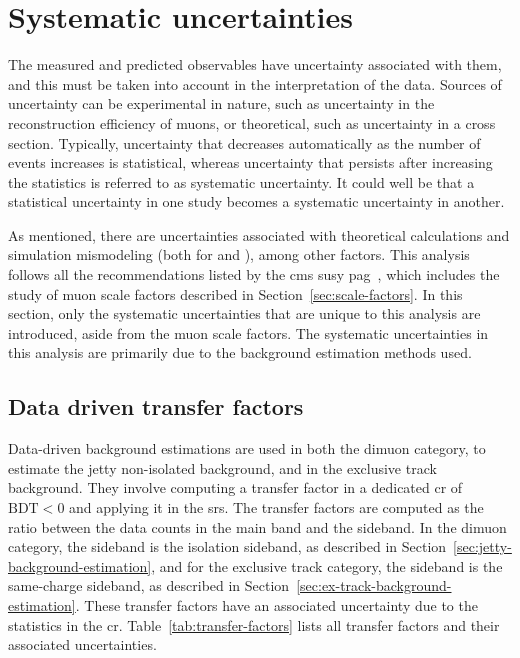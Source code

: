 \clearpage
\section{Systematic uncertainties}
\label{sec:systematic-uncertainties}

The measured and predicted observables have uncertainty associated with them, and this must be taken into account in the interpretation of the data. Sources of uncertainty can be experimental in nature, such as uncertainty in the reconstruction efficiency of muons, or theoretical, such as uncertainty in a cross section. Typically, uncertainty that decreases automatically as the number of events increases is statistical, whereas uncertainty that persists after increasing the statistics is referred to as systematic uncertainty. It could well be that a statistical uncertainty in one study becomes a systematic uncertainty in another.

As mentioned, there are uncertainties associated with theoretical calculations and simulation mismodeling (both for \FASTSIM and \FULLSIM), among other factors. This analysis follows all the recommendations listed by the \gls{cms} \gls{susy} \gls{pag}~\cite{sus-pag-recommendations}, which includes the study of muon scale factors described in Section~\ref{sec:scale-factors}. In this section, only the systematic uncertainties that are unique to this analysis are introduced, aside from the muon scale factors. The systematic uncertainties in this analysis are primarily due to the background estimation methods used.

\subsection{Data driven transfer factors}
\label{sec:data-driven-tranfer-factors}

Data-driven background estimations are used in both the dimuon category, to estimate the jetty non-isolated background, and in the exclusive track background. They involve computing a transfer factor in a dedicated \gls{cr} of $\text{BDT}<0$ and applying it in the \glspl{sr}. The transfer factors are computed as the ratio between the data counts in the main band and the sideband. In the dimuon category, the sideband is the isolation sideband, as described in Section~\ref{sec:jetty-background-estimation}, and for the exclusive track category, the sideband is the same-charge sideband, as described in Section~\ref{sec:ex-track-background-estimation}. These transfer factors have an associated uncertainty due to the statistics in the \gls{cr}. Table~\ref{tab:transfer-factors} lists all transfer factors and their associated uncertainties.

